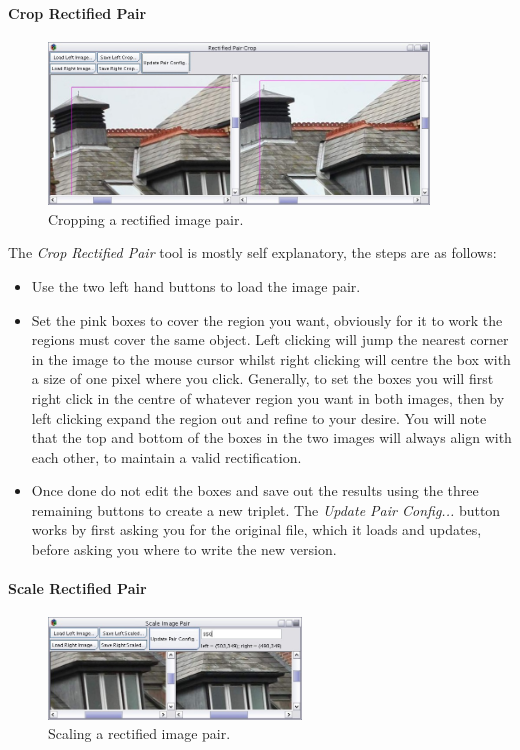 \documentclass[10pt,a4paper,twoside]{article}
\begin{document}
\paragraph{Crop Rectified Pair}

\begin{figure}
 \centering
 \includegraphics[width=0.9\textwidth]{screenshots/crop_pair}
 \caption{Cropping a rectified image pair.}
 \label{fig:crop_pair}
\end{figure}

The \emph{Crop Rectified Pair} tool is mostly self explanatory, the steps are as follows:
\begin{itemize}
\item Use the two left hand buttons to load the image pair.
\item Set the pink boxes to cover the region you want, obviously for it to work the regions must cover the same object. Left clicking will jump the nearest corner in the image to the mouse cursor whilst right clicking will centre the box with a size of one pixel where you click. Generally, to set the boxes you will first right click in the centre of whatever region you want in both images, then by left clicking expand the region out and refine to your desire. You will note that the top and bottom of the boxes in the two images will always align with each other, to maintain a valid rectification.
\item Once done do not edit the boxes and save out the results using the three remaining buttons to create a new triplet. The \emph{Update Pair Config...} button works by first asking you for the original file, which it loads and updates, before asking you where to write the new version.
\end{itemize}


\paragraph {Scale Rectified Pair}

\begin{figure}
 \centering
 \includegraphics[width=0.6\textwidth]{screenshots/scale_pair}
 \caption{Scaling a rectified image pair.}
 \label{fig:scale_pair}
\end{figure}
\end{document}
